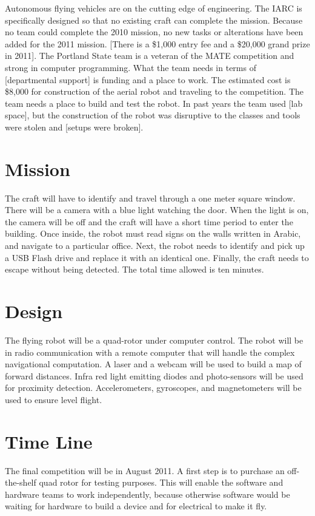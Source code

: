 \documentclass{article}
\begin{document}
Autonomous flying vehicles are on the cutting edge of engineering. The IARC is specifically designed so that no existing craft can complete the mission. Because no team could complete the 2010 mission, no new tasks or alterations have been added for the 2011 mission. [There is a \$1,000 entry fee and a \$20,000 grand prize in 2011]. The Portland State team is a veteran of the MATE competition and strong in computer programming. What the team needs in terms of [departmental support] is funding and a place to work. The estimated cost is \$8,000 for construction of the aerial robot and traveling to the competition. The team needs a place to build and test the robot. In past years the team used [lab space], but the construction of the robot was disruptive to the classes and tools were stolen and [setups were broken]. 

\section{Mission}

The craft will have to identify and travel through a one meter square window. There will be a camera with a blue light watching the door. When the light is on, the camera will be off and the craft will have a short time period to enter the building. Once inside, the robot must read signs on the walls written in Arabic, and navigate to a particular office. Next, the robot needs to identify and pick up a USB Flash drive and replace it with an identical one. Finally, the craft needs to escape without being detected. The total time allowed is ten minutes. 
\section{Design}

The flying robot will be a quad-rotor under computer control. The robot will be in radio communication with a remote computer that will handle the complex navigational computation. A laser and a webcam will be used to build a map of forward distances. Infra red light emitting diodes and photo-sensors will be used for proximity detection. Accelerometers, gyroscopes, and magnetometers will be used to ensure level flight. 

\section{Time Line}

The final competition will be in August 2011. A first step is to purchase an off-the-shelf quad rotor for testing purposes. This will enable the software and hardware teams to work independently, because otherwise software would be waiting for hardware to build a device and for electrical to make it fly. 
\end{document}
